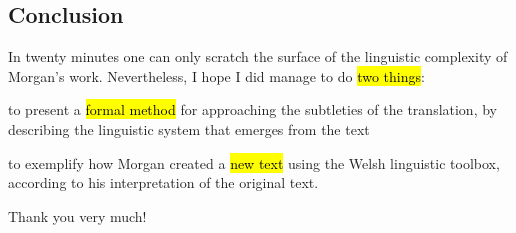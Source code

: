 \begin{paper}
	\section{Conclusion}

	In twenty minutes one can only scratch the surface of the linguistic complexity of Morgan’s work. Nevertheless, I hope I did manage to do \hl{two things}:
	\begin{compactitem}
		\item to present a \hl{formal method} for approaching the subtleties of the translation, by describing the linguistic system that emerges from the text
		\item to exemplify how Morgan created a \hl{new text} using the Welsh linguistic toolbox, according to his interpretation of the original text.
	\end{compactitem}

	Thank you very much!
\end{paper}

